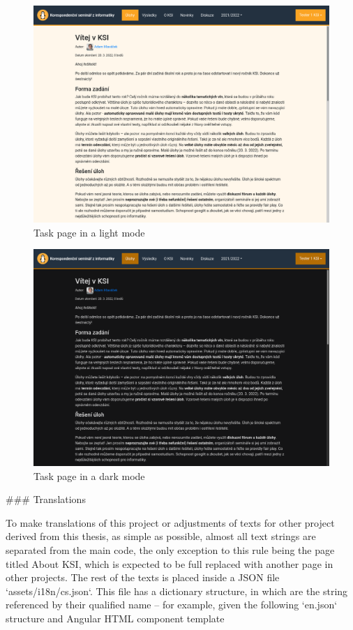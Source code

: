 \documentclass[
  digital, %
  oneside, %
  lof,     %
  lot,     %
]{fithesis4}
\begin{document}
{\begin{figure}
\includegraphics[width=.8\textwidth]{assets/img/light-mode}
\caption{Task page in a light mode}
\label{fig:light-mode}
\end{figure}

\begin{figure}
\includegraphics[width=.8\textwidth]{assets/img/dark-mode}
\caption{Task page in a dark mode}
\label{fig:dark-mode}
\end{figure}


### Translations
\label{chap:translations}

To make translations of this project or adjustments of texts for other project derived from this thesis, as simple as possible, almost all text strings are separated from the main code, the only exception to this rule being the page titled About KSI, which is expected to be full replaced with another page in other projects. The rest of the texts is placed inside a JSON file `assets/i18n/cs.json`. This file has a dictionary structure, in which are the string referenced by their qualified name -- for example, given the following `en.json` structure and Angular HTML component template

}
\end{document}
